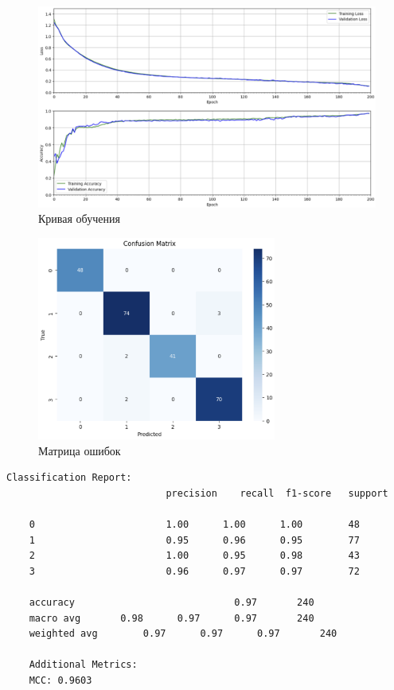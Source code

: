 \begin{figure}
	\begin{center}
		\includegraphics[width=\textwidth]{images/2.png}
	\end{center}
	\caption{Кривая обучения}
	\label{img:2}
\end{figure}

\begin{figure}
	\begin{center}
		\includegraphics[width=0.7\textwidth]{images/3.png}
	\end{center}
	\caption{Матрица ошибок}
	\label{img:3}
\end{figure}

\begin{lstlisting}[label=lst:2,caption=Отчёт по результатам классификации]
	Classification Report:
							precision    recall  f1-score   support
	
	0       				1.00      1.00      1.00        48
	1       				0.95      0.96      0.95        77
	2       				1.00      0.95      0.98        43
	3       				0.96      0.97      0.97        72
	
	accuracy                            0.97       240
	macro avg     	0.98      0.97      0.97       240
	weighted avg		0.97      0.97      0.97       240
	
	Additional Metrics:
	MCC: 0.9603
\end{lstlisting}

